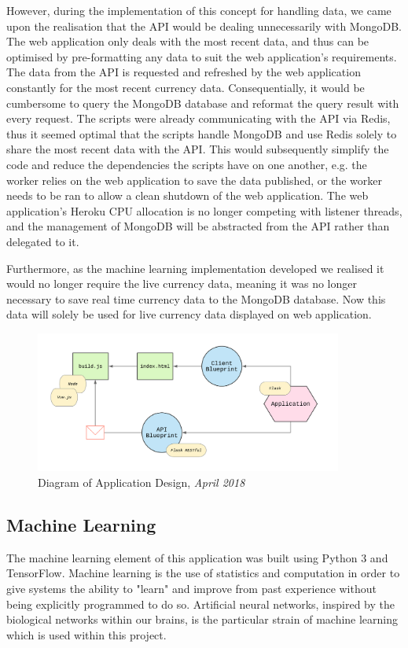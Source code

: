 However, during the implementation of this concept for handling data, we came upon the realisation that the API would be dealing unnecessarily with MongoDB. The web application only deals with the most recent data, and thus can be optimised by pre-formatting any data to suit the web application's requirements. The data from the API is requested and refreshed by the web application constantly for the most recent currency data. Consequentially, it would be cumbersome to query the MongoDB database and reformat the query result with every request. The scripts were already communicating with the API via Redis, thus it seemed optimal that the scripts handle MongoDB and use Redis solely to share the most recent data with the API. This would subsequently simplify the code and reduce the dependencies the scripts have on one another, e.g. the worker relies on the web application to save the data published, or the worker needs to be ran to allow a clean shutdown of the web application. The web application's Heroku CPU allocation is no longer competing with listener threads, and the management of MongoDB will be abstracted from the API rather than delegated to it. 

Furthermore, as the machine learning implementation developed we realised it would no longer require the live currency data, meaning it was no longer necessary to save real time currency data to the MongoDB database. Now this data will solely be used for live currency data displayed on web application.

\begin{figure}[h]
    \centering
    \includegraphics[width=0.9\textwidth, keepaspectratio]{img/techuml.png}
    \caption{Diagram of Application Design, \textit{April 2018}}
    \label{techuml}
\end{figure}

\subsection{Machine Learning}
The machine learning element of this application was built using Python 3 and TensorFlow. Machine learning is the use of statistics and computation in order to give systems the ability to "learn" and improve from past experience without being explicitly programmed to do so. Artificial neural networks, inspired by the biological networks within our brains, is the particular strain of machine learning which is used within this project.

